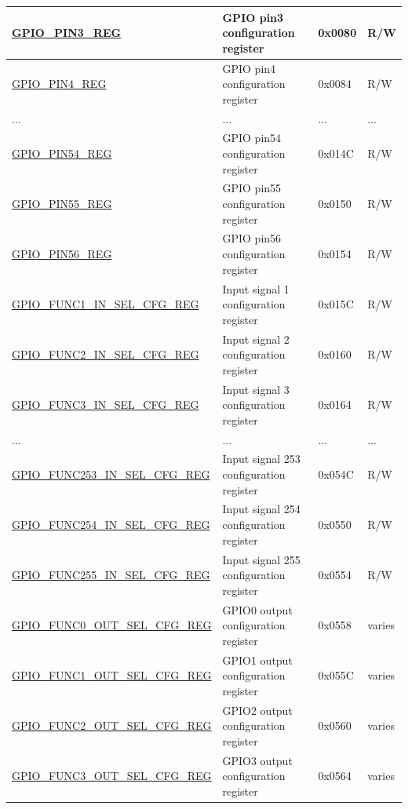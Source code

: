 \begin{longtable}{ | p{5.8cm} | p{7.2cm} | p{1.3cm} | p{2.2cm} | }
\hyperref[regdesc:GPIOPINNREG]{GPIO\_PIN3\_REG} & GPIO pin3 configuration register & 0x0080 & R/W \\ \hline
\hyperref[regdesc:GPIOPINNREG]{GPIO\_PIN4\_REG} & GPIO pin4 configuration register & 0x0084 & R/W \\ \hline
... & ... & ... & ... \\ \hline
\hyperref[regdesc:GPIOPINNREG]{GPIO\_PIN54\_REG} & GPIO pin54 configuration register & 0x014C & R/W \\ \hline
\hyperref[regdesc:GPIOPINNREG]{GPIO\_PIN55\_REG} & GPIO pin55 configuration register & 0x0150 & R/W \\ \hline
\hyperref[regdesc:GPIOPINNREG]{GPIO\_PIN56\_REG} & GPIO pin56 configuration register & 0x0154 & R/W \\ \hline
\hyperref[regdesc:GPIOFUNCNINSELCFGREG]{GPIO\_FUNC1\_IN\_SEL\_CFG\_REG} & Input signal 1 configuration register & 0x015C & R/W \\ \hline
\hyperref[regdesc:GPIOFUNCNINSELCFGREG]{GPIO\_FUNC2\_IN\_SEL\_CFG\_REG} & Input signal 2 configuration register & 0x0160 & R/W \\ \hline
\hyperref[regdesc:GPIOFUNCNINSELCFGREG]{GPIO\_FUNC3\_IN\_SEL\_CFG\_REG} & Input signal 3 configuration register & 0x0164 & R/W \\ \hline
... & ... & ... & ... \\ \hline
\hyperref[regdesc:GPIOFUNCNINSELCFGREG]{GPIO\_FUNC253\_IN\_SEL\_CFG\_REG} & Input signal 253 configuration register & 0x054C & R/W \\ \hline
\hyperref[regdesc:GPIOFUNCNINSELCFGREG]{GPIO\_FUNC254\_IN\_SEL\_CFG\_REG} & Input signal 254 configuration register & 0x0550 & R/W \\ \hline
\hyperref[regdesc:GPIOFUNCNINSELCFGREG]{GPIO\_FUNC255\_IN\_SEL\_CFG\_REG} & Input signal 255 configuration register & 0x0554 & R/W \\ \hline
\hyperref[regdesc:GPIOFUNCNOUTSELCFGREG]{GPIO\_FUNC0\_OUT\_SEL\_CFG\_REG} & GPIO0 output configuration register & 0x0558 & varies \\ \hline
\hyperref[regdesc:GPIOFUNCNOUTSELCFGREG]{GPIO\_FUNC1\_OUT\_SEL\_CFG\_REG} & GPIO1 output configuration register & 0x055C & varies \\ \hline
\hyperref[regdesc:GPIOFUNCNOUTSELCFGREG]{GPIO\_FUNC2\_OUT\_SEL\_CFG\_REG} & GPIO2 output configuration register & 0x0560 & varies \\ \hline
\hyperref[regdesc:GPIOFUNCNOUTSELCFGREG]{GPIO\_FUNC3\_OUT\_SEL\_CFG\_REG} & GPIO3 output configuration register & 0x0564 & varies \\ \hline

\end{longtable}
